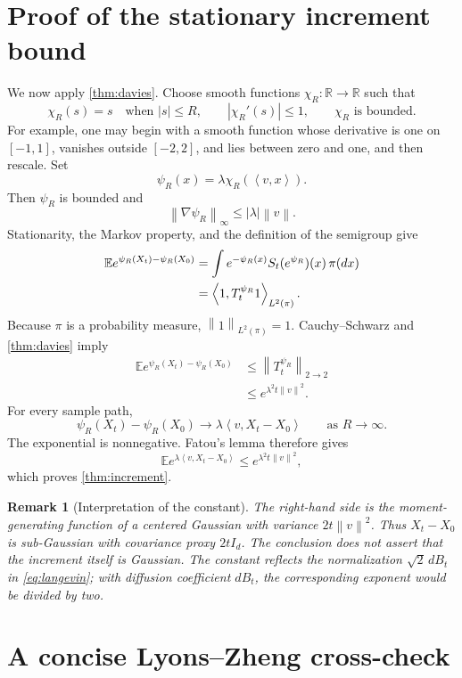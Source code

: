 \documentclass[11pt]{article}
\newtheorem{remark}[theorem]{Remark}
\newcommand{\R}{\mathbb R}
\newcommand{\E}{\mathbb E}
\newcommand{\ip}[2]{\left\langle #1,#2\right\rangle}
\newcommand{\norm}[1]{\left\lVert #1\right\rVert}
\newcommand{\abs}[1]{\left\lvert #1\right\rvert}
\newcommand{\1}{\mathbf 1}
\begin{document}
\section{Proof of the stationary increment bound}\label{sec:application}

We now apply \cref{thm:davies}.  Choose smooth functions
\(\chi_R:\R\to\R\) such that
\[
 \chi_R(s)=s\quad\text{when }\abs s\leq R,
 \qquad
 \abs{\chi_R'(s)}\leq1,
 \qquad
 \chi_R\text{ is bounded}.
\]
For example, one may begin with a smooth function whose derivative is one
on \([-1,1]\), vanishes outside \([-2,2]\), and lies between zero and one,
and then rescale.  Set
\[
 \psi_R(x)=\lambda\chi_R(\ip{v}{x}).
\]
Then \(\psi_R\) is bounded and
\[
 \norm{\nabla\psi_R}_\infty\leq\abs\lambda\norm v.
\]
Stationarity, the Markov property, and the definition of the semigroup give
\begin{align}
 \E e^{\psi_R(X_t)-\psi_R(X_0)}
 &=\int e^{-\psi_R(x)}S_t(e^{\psi_R})(x)\,\pi(dx)\notag\\
 &=\ip{1}{T_t^{\psi_R}1}_{L^2(\pi)}.\label{eq:stationary-conjugation}
\end{align}
Because \(\pi\) is a probability measure,
\(\norm1_{L^2(\pi)}=1\).  Cauchy--Schwarz and \cref{thm:davies} imply
\begin{align*}
 \E e^{\psi_R(X_t)-\psi_R(X_0)}
 &\leq\norm{T_t^{\psi_R}}_{2\to2}\\
 &\leq e^{\lambda^2t\norm v^2}.
\end{align*}
For every sample path,
\[
 \psi_R(X_t)-\psi_R(X_0)
 \longrightarrow
 \lambda\ip{v}{X_t-X_0}
 \qquad\text{as }R\to\infty.
\]
The exponential is nonnegative.  Fatou's lemma therefore gives
\[
 \E e^{\lambda\ip{v}{X_t-X_0}}
 \leq e^{\lambda^2t\norm v^2},
\]
which proves \cref{thm:increment}.

\begin{remark}[Interpretation of the constant]
The right-hand side is the moment-generating function of a centered Gaussian
with variance \(2t\norm v^2\).  Thus \(X_t-X_0\) is sub-Gaussian with
covariance proxy \(2tI_d\).  The conclusion does not assert that the
increment itself is Gaussian.  The constant reflects the normalization
\(\sqrt2\,dB_t\) in \eqref{eq:langevin}; with diffusion coefficient
\(dB_t\), the corresponding exponent would be divided by two.
\end{remark}

\section{A concise Lyons--Zheng cross-check}\label{sec:lz}
\end{document}
